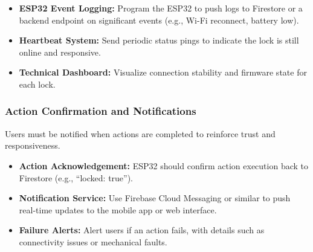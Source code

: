 \begin{itemize}
  \item \textbf{ESP32 Event Logging:} Program the ESP32 to push logs to Firestore or a backend endpoint on significant events (e.g., Wi-Fi reconnect, battery low).
  \item \textbf{Heartbeat System:} Send periodic status pings to indicate the lock is still online and responsive.
  \item \textbf{Technical Dashboard:} Visualize connection stability and firmware state for each lock.
\end{itemize}

\subsubsection{Action Confirmation and Notifications}

Users must be notified when actions are completed to reinforce trust and responsiveness.

\begin{itemize}
  \item \textbf{Action Acknowledgement:} ESP32 should confirm action execution back to Firestore (e.g., “locked: true”).
  \item \textbf{Notification Service:} Use Firebase Cloud Messaging or similar to push real-time updates to the mobile app or web interface.
  \item \textbf{Failure Alerts:} Alert users if an action fails, with details such as connectivity issues or mechanical faults.
\end{itemize}
